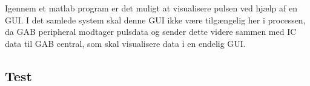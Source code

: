 Igennem et matlab program er det muligt at visualisere pulsen ved hjælp af en GUI. I det samlede system skal denne GUI ikke være tilgængelig her i processen, da GAB peripheral modtager pulsdata og sender dette videre sammen med IC data til GAB central, som skal visualisere data i en endelig GUI.
\subsection{Test}


